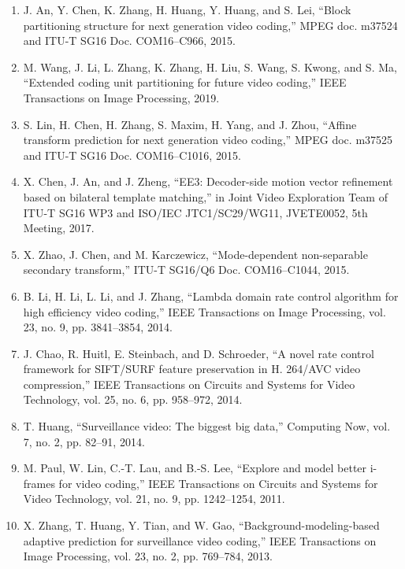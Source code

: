 \documentclass{article}
\begin{document}
\begin{enumerate}
	\item J. An, Y. Chen, K. Zhang, H. Huang, Y. Huang, and S. Lei, “Block
	partitioning structure for next generation video coding,” MPEG doc.
	m37524 and ITU-T SG16 Doc. COM16–C966, 2015.

	\item M. Wang, J. Li, L. Zhang, K. Zhang, H. Liu, S. Wang, S. Kwong,
	and S. Ma, “Extended coding unit partitioning for future video coding,”
	IEEE Transactions on Image Processing, 2019.

	\item S. Lin, H. Chen, H. Zhang, S. Maxim, H. Yang, and J. Zhou, “Affine
	transform prediction for next generation video coding,” MPEG doc.
	m37525 and ITU-T SG16 Doc. COM16–C1016, 2015.

	\item X. Chen, J. An, and J. Zheng, “EE3: Decoder-side motion vector refinement based on bilateral template matching,” in Joint Video Exploration
	Team of ITU-T SG16 WP3 and ISO/IEC JTC1/SC29/WG11, JVETE0052, 5th Meeting, 2017.

	\item X. Zhao, J. Chen, and M. Karczewicz, “Mode-dependent non-separable
	secondary transform,” ITU-T SG16/Q6 Doc. COM16–C1044, 2015.

	\item B. Li, H. Li, L. Li, and J. Zhang, “Lambda domain rate control algorithm for
	high efficiency video coding,” IEEE Transactions on Image Processing,
	vol. 23, no. 9, pp. 3841–3854, 2014.

	\item J. Chao, R. Huitl, E. Steinbach, and D. Schroeder, “A novel rate control
	framework for SIFT/SURF feature preservation in H. 264/AVC video
	compression,” IEEE Transactions on Circuits and Systems for Video
	Technology, vol. 25, no. 6, pp. 958–972, 2014.

	\item T. Huang, “Surveillance video: The biggest big data,” Computing Now,
	vol. 7, no. 2, pp. 82–91, 2014.

	\item M. Paul, W. Lin, C.-T. Lau, and B.-S. Lee, “Explore and model better
	i-frames for video coding,” IEEE Transactions on Circuits and Systems
	for Video Technology, vol. 21, no. 9, pp. 1242–1254, 2011.

	\item X. Zhang, T. Huang, Y. Tian, and W. Gao, “Background-modeling-based
	adaptive prediction for surveillance video coding,” IEEE Transactions
	on Image Processing, vol. 23, no. 2, pp. 769–784, 2013.


\end{enumerate}
\end{document}

